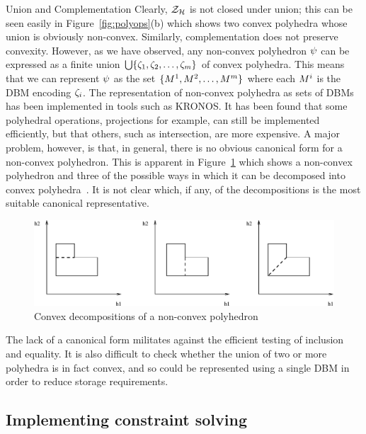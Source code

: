 {\begin{paragraph}{Union and Complementation}
Clearly, $\ClockZones$ is not closed under union; this can be seen
easily in Figure~\ref{fig:polyops}(b) which shows two convex polyhedra
whose union is obviously non-convex. Similarly, complementation does
not preserve convexity. However, as we have observed, any non-convex
polyhedron ${\psi}$ can be expressed as a finite union $\bigcup
\{{\zeta}_1, {\zeta}_2,\ldots,{\zeta}_m\}$ of convex polyhedra.
This means that we can represent ${\psi}$ as the set $\{{M}^1, {M}^2,
\ldots, {M}^m\}$ where each ${M}^i$ is the DBM encoding
${\zeta}_i$. The representation of non-convex polyhedra as sets of
DBMs has been implemented in tools such as KRONOS. It has been found
that some polyhedral operations, projections for example, can still be
implemented efficiently, but that others, such as intersection, are
more expensive. A major problem, however, is that, in general, there
is no obvious canonical form for a non-convex polyhedron. This is
apparent in Figure~\ref{fig:decomp} which shows a non-convex
polyhedron and three of the possible ways in which it can be
decomposed into convex polyhedra~\cite{tri:98}. It is not clear which,
if any, of the decompositions is the most suitable canonical
representative.
\begin{figure}
\begin{center}
\includegraphics[width=\linewidth]{METHODS/decomp.eps}
\end{center}
\caption{Convex decompositions of a non-convex polyhedron\label{fig:decomp}}
\end{figure}
The lack of a canonical form militates against the efficient testing of
inclusion and equality. It is also difficult to check whether
the union of two or more polyhedra is in fact convex, and so could be
represented using a single DBM in order to reduce storage requirements.
\end{paragraph}

\subsection{Implementing constraint solving}
}
